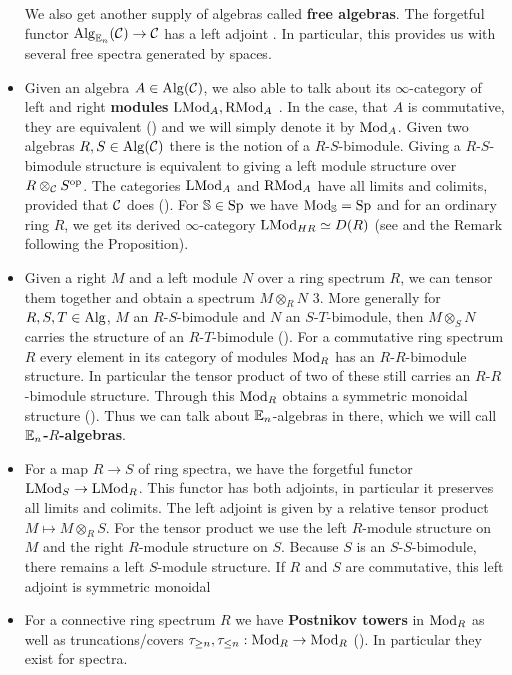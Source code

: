 \begin{itemize}
    We also get another supply of algebras called \textbf{free algebras}. The forgetful functor $\operatorname{Alg}_{\mathbb{E}_n}(\mathcal{C})\to \mathcal{C}$ has a left adjoint \cite[Corollary~3.1.3.5]{lurie2017higher}. In particular, this provides us with several free spectra generated by spaces. 
    \item Given an algebra $A\in \operatorname{Alg}(\mathcal{C})$, we also able to talk about its $\infty$-category of left and right \textbf{modules }$\operatorname{LMod}_A, \operatorname{RMod}_A$ \cite[Definition~4.2.1.13]{lurie2017higher}. In the case, that $A$ is commutative, they are equivalent (\cite[Section~4.3.2]{lurie2017higher}) and we will simply denote it by $\operatorname{Mod}_A$. Given two algebras $R,S\in \operatorname{Alg}(\mathcal{C})$ there is the notion of a $R$-$S$-bimodule. Giving a $R$-$S$-bimodule structure is equivalent to giving a left module structure over $R\otimes_{\mathcal{C}} S^{\operatorname{op}}$. The categories $\operatorname{LMod}_A$ and $\operatorname{RMod}_A$ have all limits and colimits, provided that $\mathcal{C}$ does (\cite[Section~4.2.3]{lurie2017higher}). For $\mathbb{S}\in\operatorname{Sp}$ we have $\operatorname{Mod}_{\mathbb{S}}=\operatorname{Sp}$ and for an ordinary ring $R$, we get its derived $\infty$-category $\operatorname{LMod}_{HR}\simeq D(R)$ (see \cite[Proposition~7.1.1.15]{lurie2017higher} and the Remark following the Proposition).
    \item Given a right $M$ and a left module $N$ over a ring spectrum $R$, we can tensor them together and obtain a spectrum $M\otimes_R N$ 3. More generally for $R,S,T\in \operatorname{Alg}$, $M$ an $R$-$S$-bimodule and $N$ an $S$-$T$-bimodule, then $M\otimes_S N$ carries the structure of an $R$-$T$-bimodule (\cite[Section~4.4.2]{lurie2017higher}). 
    For a commutative ring spectrum $R$ every element in its category of modules $\operatorname{Mod}_R$ has an $R$-$R$-bimodule structure. In particular the tensor product of two of these still carries an $R$-$R$-bimodule structure. Through this $\operatorname{Mod}_R$ obtains a symmetric monoidal structure (\cite[Theorem~4.5.2.1]{lurie2017higher}). Thus we can talk about $\mathbb{E}_n$-algebras in there, which we will call \textbf{$\mathbb{E}_n$-$R$-algebras}.
    \item For a map $R\to S$ of ring spectra, we have the forgetful functor $\operatorname{LMod}_S\to \operatorname{LMod}_R$. This functor has both adjoints, in particular it preserves all limits and colimits. The left adjoint is given by a relative tensor product $M\mapsto M\otimes_R S$. For the tensor product we use the left $R$-module structure on $M$ and the right $R$-module structure on $S$. Because $S$ is an $S$-$S$-bimodule, there remains a left $S$-module structure. If $R$ and $S$ are commutative, this left adjoint is symmetric monoidal \cite[Section~4.5.3]{lurie2017higher}
    \item For a connective ring spectrum $R$ we have \textbf{Postnikov towers} in $\operatorname{Mod}_R$ as well as truncations/covers $\tau_{\geq n},\tau_{\leq n}:\operatorname{Mod}_R\to \operatorname{Mod}_R$ (\cite[Proposition~7.1.1.13]{lurie2017higher}). In particular they exist for spectra.

\end{itemize}
